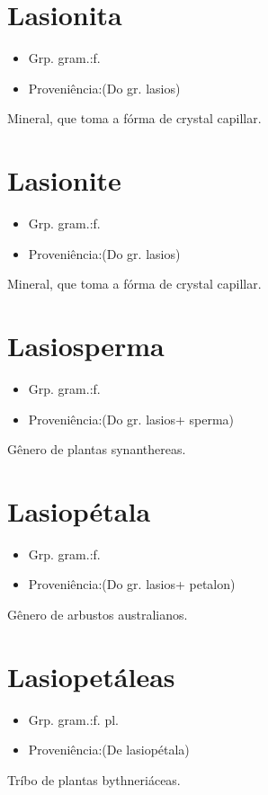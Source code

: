 \section{Lasionita}
\begin{itemize}
\item {Grp. gram.:f.}
\end{itemize}
\begin{itemize}
\item {Proveniência:(Do gr. \textunderscore lasios\textunderscore )}
\end{itemize}
Mineral, que toma a fórma de crystal capillar.
\section{Lasionite}
\begin{itemize}
\item {Grp. gram.:f.}
\end{itemize}
\begin{itemize}
\item {Proveniência:(Do gr. \textunderscore lasios\textunderscore )}
\end{itemize}
Mineral, que toma a fórma de crystal capillar.
\section{Lasiosperma}
\begin{itemize}
\item {Grp. gram.:f.}
\end{itemize}
\begin{itemize}
\item {Proveniência:(Do gr. \textunderscore lasios\textunderscore  + \textunderscore sperma\textunderscore )}
\end{itemize}
Gênero de plantas synanthereas.
\section{Lasiopétala}
\begin{itemize}
\item {Grp. gram.:f.}
\end{itemize}
\begin{itemize}
\item {Proveniência:(Do gr. \textunderscore lasios\textunderscore  + \textunderscore petalon\textunderscore )}
\end{itemize}
Gênero de arbustos australianos.
\section{Lasiopetáleas}
\begin{itemize}
\item {Grp. gram.:f. pl.}
\end{itemize}
\begin{itemize}
\item {Proveniência:(De \textunderscore lasiopétala\textunderscore )}
\end{itemize}
Tríbo de plantas bythneriáceas.
